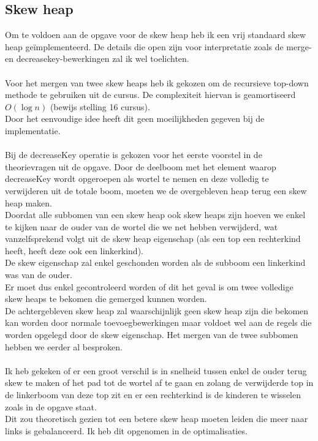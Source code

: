 \documentclass[10pt,a4paper,twoside]{article}
\begin{document}
\subsection{Skew heap}
Om te voldoen aan de opgave voor de skew heap heb ik een vrij standaard skew heap geïmplementeerd.
De details die open zijn voor interpretatie zoals de merge- en decreasekey-bewerkingen zal ik wel toelichten.
\\\\
Voor het mergen van twee skew heaps heb ik gekozen om de recursieve top-down methode te gebruiken uit de cursus.
De complexiteit hiervan is geamortiseerd $O(\log{}n)$ (bewijs stelling 16 cursus). \\Door het eenvoudige idee heeft dit geen moeilijkheden gegeven bij de implementatie.
\\\\
Bij de {\selectfont decreaseKey} operatie is gekozen voor het eerste voorstel in de theorievragen uit de opgave.
Door de deelboom met het element waarop {\selectfont decreaseKey} wordt opgeroepen als wortel te nemen en deze volledig te verwijderen uit de totale boom, moeten we de overgebleven heap terug een skew heap maken.\\
Doordat alle subbomen van een skew heap ook skew heaps zijn hoeven we enkel te kijken naar de ouder van de wortel die we net hebben verwijderd, wat vanzelfsprekend volgt uit de skew heap eigenschap (als een top een rechterkind heeft, heeft deze ook een linkerkind).\\ 
De skew eigenschap zal enkel geschonden worden als de subboom een linkerkind was van de ouder.\\
Er moet dus enkel gecontroleerd worden of dit het geval is om twee volledige skew heaps te bekomen die gemerged kunnen worden.\\
De achtergebleven skew heap zal waarschijnlijk geen skew heap zijn die bekomen kan worden door normale toevoegbewerkingen maar voldoet wel aan de regels die worden opgelegd door de skew eigenschap. Het mergen van de twee subbomen hebben we eerder al besproken.
\\\\
Ik heb gekeken of er een groot verschil is in snelheid tussen enkel de ouder terug skew te maken of het pad tot de wortel af te gaan en zolang de verwijderde top in de linkerboom van deze top zit en er een rechterkind is de kinderen te wisselen zoals in de opgave staat.\\
Dit zou theoretisch gezien tot een betere skew heap moeten leiden die meer naar links is gebalanceerd. Ik heb dit opgenomen in de optimalisaties.
\end{document}

